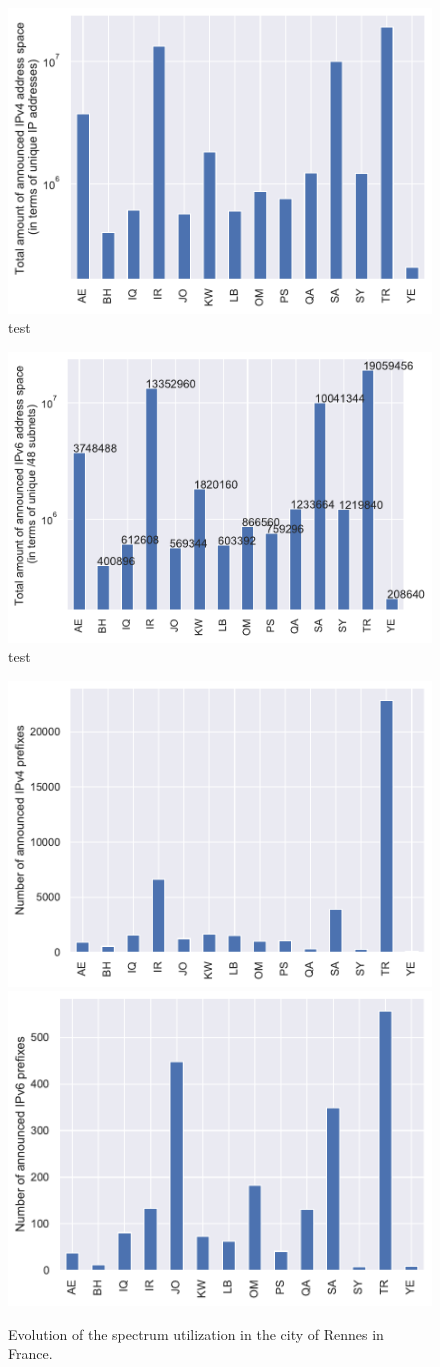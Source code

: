 \documentclass[a4paper,titlepage]{article}
\begin{document}
\begin{figure}
    \centering
    \includegraphics[width=0.75\linewidth]{../output/ips-v4.pdf}
    \caption{test}
\end{figure}

\begin{figure}
    \centering
    \includegraphics[width=0.75\linewidth]{../output/48s-v6.pdf}
    \caption{test}
\end{figure}

\begin{figure}
    \centering
    {\includegraphics[width=0.45\linewidth]{../output/prefix-v4.pdf}}
    {\includegraphics[width=0.45\linewidth]{../output/prefix-v6.pdf}}
    \caption{Evolution of the spectrum utilization in the city of Rennes in France.
    \label{fig:perc-antenna-evo}
    }
\end{figure}
\end{document}
